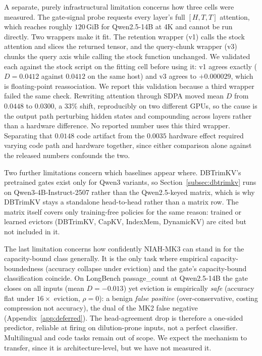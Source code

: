 A separate, purely infrastructural limitation concerns how three cells
were measured. \label{subsec:wrapper-provenance} The gate-signal probe
requests every layer's full $[H, T, T]$ attention, which reaches roughly
$120$\,GiB for Qwen2.5-14B at 4K and cannot be run directly. Two
wrappers make it fit. The retention wrapper (v1) calls the stock
attention and slices the returned tensor, and the query-chunk wrapper
(v3) chunks the query axis while calling the stock function unchanged.
We validated each against the stock script on the fitting cell before
using it: v1 agrees exactly ($D = 0.0412$ against $0.0412$ on the same
host) and v3 agrees to $+0.000029$, which is floating-point
reassociation. We report this validation because a third wrapper failed
the same check. Rewriting attention through SDPA moved mean $D$ from
$0.0448$ to $0.0300$, a $33\%$ shift, reproducibly on two different
GPUs, so the cause is the output path perturbing hidden states and
compounding across layers rather than a hardware difference. No
reported number uses this third wrapper. Separating that $0.0148$ code
artifact from the $0.0035$ hardware effect required varying code path
and hardware together, since either comparison alone against the
released numbers confounds the two.

Two further limitations concern which baselines appear where. DBTrimKV's
pretrained gates exist only for Qwen3 variants, so
Section~\ref{subsec:dbtrimkv} runs on Qwen3-4B-Instruct-2507 rather than
the Qwen2.5-keyed matrix, which is why DBTrimKV stays a standalone
head-to-head rather than a matrix row. The matrix itself covers only
training-free policies for the same reason: trained or learned evictors
(DBTrimKV, CapKV, IndexMem, DynamicKV) are cited but not included in it.

The last limitation concerns how confidently NIAH-MK3 can stand in for
the capacity-bound class generally. It is the only task where empirical
capacity-boundedness (accuracy collapse under eviction) and the gate's
capacity-bound classification coincide. On LongBench passage\_count at
Qwen2.5-14B the gate closes on all inputs (mean $D = -0.013$) yet
eviction is empirically \emph{safe} (accuracy flat under $16\times$
eviction, $\rho = 0$): a benign \emph{false positive} (over-conservative,
costing compression not accuracy), the dual of the MK2 false negative
(Appendix~\ref{app:deferred}). The head-agreement drop is therefore a
one-sided predictor, reliable at firing on dilution-prone inputs, not a
perfect classifier. Multilingual and code tasks remain out of scope. We
expect the mechanism to transfer, since it is architecture-level, but we
have not measured it.

